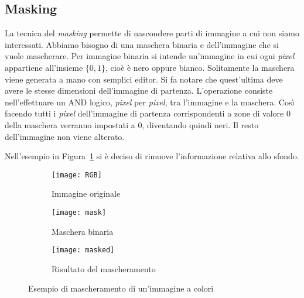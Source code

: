 \subsection {Masking}
La tecnica del \textit{masking} permette di nascondere parti di immagine a cui non siamo interessati.
Abbiamo bisogno di una maschera binaria e dell'immagine che si vuole mascherare.
Per immagine binaria si intende un'immagine in cui ogni \textit{pixel} appartiene all'insieme $\{0,1\}$, cioè è nero oppure bianco.
Solitamente la maschera viene generata a mano con semplici editor.
Si fa notare che quest'ultima deve avere le stesse dimensioni dell'immagine di partenza.
L'operazione consiste nell'effettuare un AND logico, \textit{pixel} per \textit{pixel},  tra l'immagine e la maschera.
Così facendo tutti i \textit{pixel} dell'immagine di partenza corrispondenti a zone di valore $0$ della maschera verranno impostati a $0$, diventando quindi neri.
Il resto dell'immagine non viene alterato.

Nell'esempio in Figura~\ref{fig:mask_example} si è deciso di rimuove l'informazione relativa allo sfondo.

\begin{figure}[ht] %
  \begin{center}
  \begin{subfigure}{.49\linewidth}
    \centering\texttt{[image: RGB]}
    \caption{Immagine originale}
  \end{subfigure}
  \begin{subfigure}{.49\linewidth}
    \centering\texttt{[image: mask]}
    \caption{Maschera binaria}
  \end{subfigure}
  \begin{subfigure}{.49\linewidth}
    \centering\texttt{[image: masked]}
    \caption{Risultato del mascheramento}
  \end{subfigure}
  \end{center}
    \caption{Esempio di mascheramento di un'immagine a colori}
    \label{fig:mask_example}
\end{figure}


